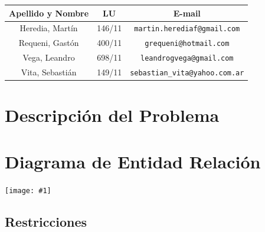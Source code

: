 \documentclass[a4paper, 10pt, twoside]{article}
\newcommand{\diagramah}[1]{
  \texttt{[image: \#1]}
}
\begin{document}
\begin{center}
\vspace{0.5cm}

\begin{tabular}{|c|c|c|}
\hline
Apellido y Nombre & LU & E-mail\\
\hline
Heredia, Martín  & 146/11 & {\tt martin.herediaf@gmail.com}\\
Requeni, Gastón  & 400/11 & {\tt grequeni@hotmail.com}\\
Vega, Leandro    & 698/11 & {\tt leandrogvega@gmail.com}\\
Vita, Sebastián  & 149/11 & {\tt sebastian\_vita@yahoo.com.ar}\\
\hline
\end{tabular}

\end{center}

\newpage
{} 



\tableofcontents

\newpage



\section{Descripción del Problema}


\newpage




\section{Diagrama de Entidad Relación}
\diagramah{DER}

\newpage

\subsection{Restricciones}

\end{document}

